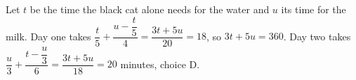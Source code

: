 Let $t$ be the time the black cat alone needs for the water and $u$ its time for the milk. Day one takes $\dfrac{t}{5}+\dfrac{u-\dfrac{t}{5}}{4}=\dfrac{3t+5u}{20}=18$, so $3t+5u=360$. Day two takes $\dfrac{u}{3}+\dfrac{t-\dfrac{u}{3}}{6}=\dfrac{3t+5u}{18}=\boxed{20}$ minutes, choice D.
